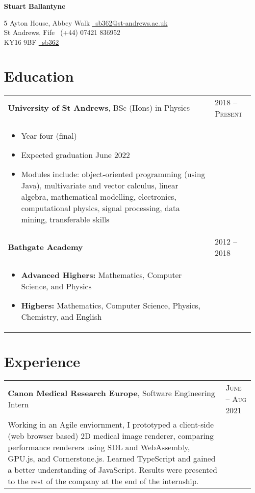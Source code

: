 \documentclass{article}
\begin{document}
	
	\begin{center}
		\par{{\Large \textbf{Stuart Ballantyne}}\par}
	\end{center}
	
	\begin{center}
		5 Ayton House, Abbey Walk \hfill \href{mailto:sb362@st-andrews.ac.uk}{\faEnvelope\ sb362@st-andrews.ac.uk}\\
		St Andrews, Fife \hfill \faMobile\ (+44) 07421 836952\\
		KY16 9BF \hfill \href{https://github.com/sb362}{\faGithub\ sb362}
	\end{center}
	
	\section*{Education}
	\begin{tabular}{p{15.6cm}l}
		\textbf{University of St Andrews}, BSc (Hons) in Physics & \textsc{2018 -- Present} \\
		\begin{itemize}
			\item Year four (final)
			\item Expected graduation June 2022
			\item Modules include: object-oriented programming (using Java), multivariate and vector calculus, linear algebra, mathematical modelling, electronics, computational physics, signal processing, data mining, transferable skills
		\end{itemize}\\
		\textbf{Bathgate Academy} & \textsc{2012 -- 2018} \\
		\begin{itemize}
			\item \textbf{Advanced Highers:} Mathematics, Computer Science, and Physics
			\item \textbf{Highers:} Mathematics, Computer Science, Physics, Chemistry, and English
		\end{itemize}
	\end{tabular}
	\vspace{-1ex}
	\setlist{}
	
	\section*{Experience}
	\begin{tabular}{p{15.6cm}l}
		\textbf{Canon Medical Research Europe}, Software Engineering Intern & \textsc{June -- Aug 2021}\\
		Working in an Agile enviornment, I prototyped a client-side (web browser based) 2D medical image renderer, comparing performance renderers using SDL and WebAssembly, GPU.js, and Cornerstone.js. Learned TypeScript and gained a better understanding of JavaScript. Results were presented to the rest of the company at the end of the internship.
	\end{tabular}
	
\end{document}

